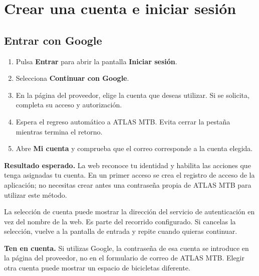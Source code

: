 \documentclass[12pt,letterpaper]{article}
\newcommand{\control}[1]{\textbf{#1}}
\newcommand{\resultado}[1]{\par\noindent\textbf{Resultado esperado.} #1\par}
\newcommand{\consejo}[1]{\par\noindent\textbf{Ten en cuenta.} #1\par}
\begin{document}
\section{Crear una cuenta e iniciar sesión}\label{sec:cuenta}
\subsection{Entrar con Google}
\begin{enumerate}
\item Pulsa \control{Entrar} para abrir la pantalla \control{Iniciar sesión}.
\item Selecciona \control{Continuar con Google}.
\item En la página del proveedor, elige la cuenta que deseas utilizar. Si se solicita, completa su acceso y autorización.
\item Espera el regreso automático a ATLAS MTB. Evita cerrar la pestaña mientras termina el retorno.
\item Abre \control{Mi cuenta} y comprueba que el correo corresponde a la cuenta elegida.
\end{enumerate}
\resultado{La web reconoce tu identidad y habilita las acciones que tenga asignadas tu cuenta. En un primer acceso se crea el registro de acceso de la aplicación; no necesitas crear antes una contraseña propia de ATLAS MTB para utilizar este método.}

La selección de cuenta puede mostrar la dirección del servicio de autenticación en vez del nombre de la web. Es parte del recorrido configurado. Si cancelas la selección, vuelve a la pantalla de entrada y repite cuando quieras continuar.
\consejo{Si utilizas Google, la contraseña de esa cuenta se introduce en la página del proveedor, no en el formulario de correo de ATLAS MTB. Elegir otra cuenta puede mostrar un espacio de bicicletas diferente.}
\end{document}
